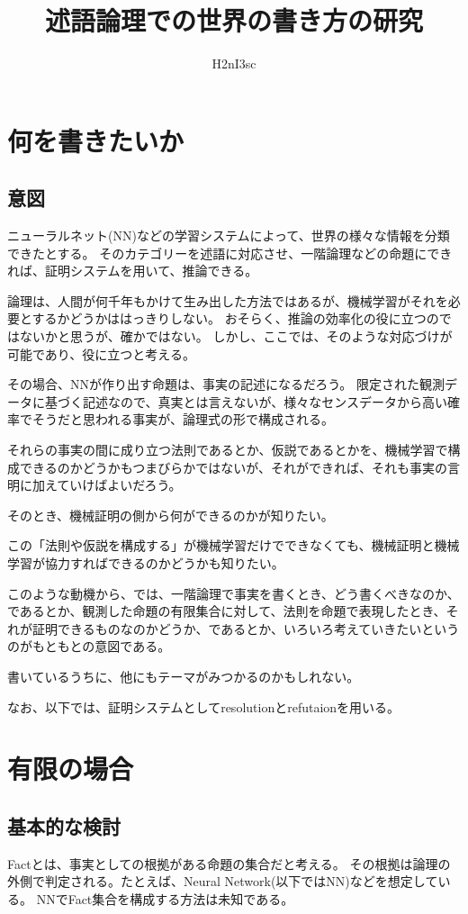 \documentclass[10pt, oneside]{jarticle}   	%
\title{述語論理での世界の書き方の研究}
\author{H2nI3sc}
\begin{document}
\maketitle

\section{何を書きたいか}
\subsection{意図}
ニューラルネット(NN)などの学習システムによって、世界の様々な情報を分類できたとする。
そのカテゴリーを述語に対応させ、一階論理などの命題にできれば、証明システムを用いて、推論できる。

論理は、人間が何千年もかけて生み出した方法ではあるが、機械学習がそれを必要とするかどうかははっきりしない。
おそらく、推論の効率化の役に立つのではないかと思うが、確かではない。
しかし、ここでは、そのような対応づけが可能であり、役に立つと考える。

その場合、NNが作り出す命題は、事実の記述になるだろう。
限定された観測データに基づく記述なので、真実とは言えないが、様々なセンスデータから高い確率でそうだと思われる事実が、論理式の形で構成される。

それらの事実の間に成り立つ法則であるとか、仮説であるとかを、機械学習で構成できるのかどうかもつまびらかではないが、それができれば、それも事実の言明に加えていけばよいだろう。

そのとき、機械証明の側から何ができるのかが知りたい。

この「法則や仮説を構成する」が機械学習だけでできなくても、機械証明と機械学習が協力すればできるのかどうかも知りたい。

このような動機から、では、一階論理で事実を書くとき、どう書くべきなのか、であるとか、観測した命題の有限集合に対して、法則を命題で表現したとき、それが証明できるものなのかどうか、であるとか、いろいろ考えていきたいというのがもともとの意図である。

書いているうちに、他にもテーマがみつかるのかもしれない。

なお、以下では、証明システムとしてresolutionとrefutaionを用いる。




\newpage

\section{有限の場合}
\subsection{基本的な検討}
Factとは、事実としての根拠がある命題の集合だと考える。
その根拠は論理の外側で判定される。たとえば、Neural Network(以下ではNN)などを想定している。
NNでFact集合を構成する方法は未知である。
\end{document}

